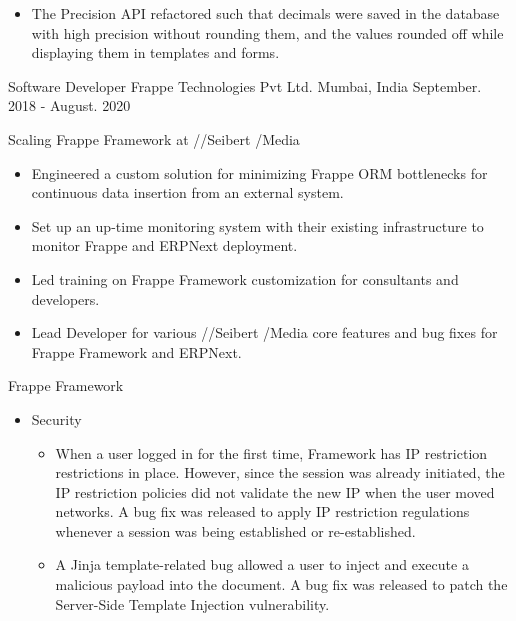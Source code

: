 \begin{cventries}
{\begin{cvitems}
\begin{itemize}
\begin{itemize}
                        \item {The Precision API refactored such that decimals were saved in the database with high precision without rounding them, and the values rounded off while displaying them in templates and forms.}
                    \end{itemize}
            \end{itemize}
      \end{cvitems}
    } 
  \cventry
    {Software Developer} %
    {Frappe Technologies Pvt Ltd.} %
    {Mumbai, India} %
    {September. 2018 - August. 2020} %
    {
      \begin{cvitems} %
        \item {Scaling Frappe Framework at //Seibert /Media}
            \begin{itemize}
                \item {Engineered a custom solution for minimizing Frappe ORM bottlenecks for continuous data insertion from an external system.}
                \item {Set up an up-time monitoring system with their existing infrastructure to monitor Frappe and ERPNext deployment.}
                \item {Led training on Frappe Framework customization for consultants and developers.}
                \item {Lead Developer for various //Seibert /Media core features and bug fixes for Frappe Framework and ERPNext.}
            \end{itemize}
        \item {Frappe Framework}
            \begin{itemize}
                \item {Security}
                    \begin{itemize}
                        \item {When a user logged in for the first time, Framework has IP restriction restrictions in place. However, since the session was already initiated, the IP restriction policies did not validate the new IP when the user moved networks. A bug fix was released to apply IP restriction regulations whenever a session was being established or re-established.}
                        \item {A Jinja template-related bug allowed a user to inject and execute a malicious payload into the document. A bug fix was released to patch the Server-Side Template Injection vulnerability.}

\end{itemize}
\end{itemize}
\end{cvitems}}
\end{cventries}
